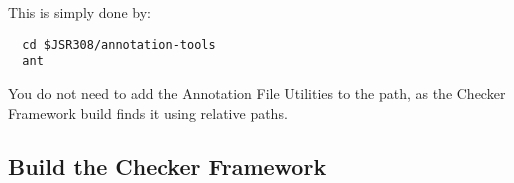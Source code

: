 This is simply done by:

\begin{Verbatim}
  cd $JSR308/annotation-tools
  ant
\end{Verbatim}

You do not need to add the Annotation File Utilities to the path, as
the Checker Framework build finds it using relative paths.


\subsection{Build the Checker Framework\label{building}}


